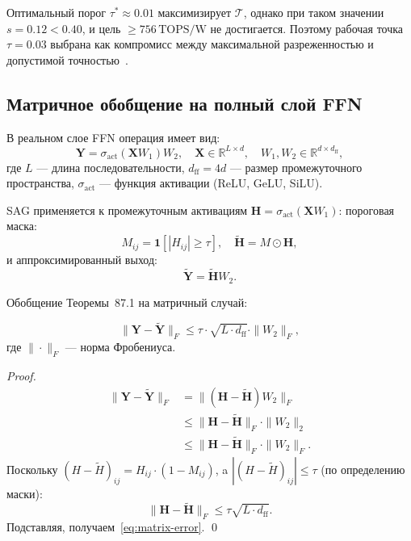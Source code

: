 Оптимальный порог $\tau^* \approx 0{.}01$ максимизирует $\mathcal{T}$,
однако при таком значении $s = 0{.}12 < 0{.}40$, и цель
$\geq 756\,\text{TOPS/W}$ не достигается.  Поэтому рабочая
точка $\tau = 0{.}03$ выбрана как компромисс между
максимальной разреженностью и допустимой точностью~\cite{koren2024sparsity}.

\subsection{Матричное обобщение на полный слой FFN}
\label{ssec:glava87-matrix}

В реальном слое FFN операция имеет вид:
\begin{equation}
  \mathbf{Y} = \sigma_\text{act}(\mathbf{X} W_1) W_2,
  \quad \mathbf{X} \in \mathbb{R}^{L \times d},
  \quad W_1, W_2 \in \mathbb{R}^{d \times d_\text{ff}},
  \label{eq:ffn-full}
\end{equation}
где $L$ — длина последовательности, $d_\text{ff} = 4d$ — размер
промежуточного пространства, $\sigma_\text{act}$ — функция активации
(ReLU, GeLU, SiLU).

SAG применяется к промежуточным активациям
$\mathbf{H} = \sigma_\text{act}(\mathbf{X} W_1)$:
пороговая маска:
\begin{equation}
  M_{ij} = \mathbf{1}[|H_{ij}| \geq \tau],
  \quad \tilde{\mathbf{H}} = M \odot \mathbf{H},
  \label{eq:ffn-mask}
\end{equation}
и аппроксимированный выход:
\begin{equation}
  \tilde{\mathbf{Y}} = \tilde{\mathbf{H}} W_2.
  \label{eq:ffn-approx}
\end{equation}

Обобщение Теоремы~87.1 на матричный случай:
\begin{proposition}
\label{prop:matrix-bound}
\begin{equation}
  \|\mathbf{Y} - \tilde{\mathbf{Y}}\|_F
  \leq \tau \cdot \sqrt{L \cdot d_\text{ff}} \cdot \|W_2\|_F,
  \label{eq:matrix-error}
\end{equation}
где $\|\cdot\|_F$ — норма Фробениуса.
\end{proposition}

\begin{proof}
\begin{align}
  \|\mathbf{Y} - \tilde{\mathbf{Y}}\|_F
  &= \|(\mathbf{H} - \tilde{\mathbf{H}}) W_2\|_F \nonumber \\
  &\leq \|\mathbf{H} - \tilde{\mathbf{H}}\|_F \cdot \|W_2\|_2 \nonumber \\
  &\leq \|\mathbf{H} - \tilde{\mathbf{H}}\|_F \cdot \|W_2\|_F. \nonumber
\end{align}
Поскольку $(H - \tilde{H})_{ij} = H_{ij} \cdot (1 - M_{ij})$,
a $|(H - \tilde{H})_{ij}| \leq \tau$ (по определению маски):
\[
  \|\mathbf{H} - \tilde{\mathbf{H}}\|_F
  \leq \tau \sqrt{L \cdot d_\text{ff}}.
\]
Подставляя, получаем~\eqref{eq:matrix-error}.
\qed
\end{proof}

